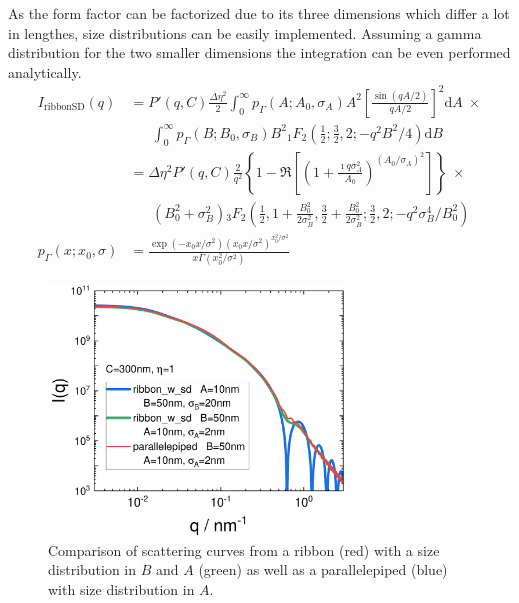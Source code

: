 As the form factor can be factorized due to its three dimensions which differ a lot in lengthes, size distributions can be easily implemented. Assuming a gamma distribution for the two smaller dimensions the integration can be even performed analytically.
\begin{align}\label{eq:ribbon_w_sd}
  I_\mathrm{ribbonSD}(q) &= P'(q,C) \frac{\Delta\eta^2}{2}
  \int_0^\infty p_\Gamma(A;A_0,\sigma_A) A^2 \left[\frac{\sin(qA/2)}{qA/2}\right]^2 \mathrm{d}A \; \times\nonumber \\
 &\phantom{=} \; \int_0^\infty p_\Gamma(B;B_0,\sigma_B) B^2 {}_1F_2\left(\frac12;\frac32,2;-q^2B^2/4\right) \mathrm{d}B \\
   &= \Delta\eta^2 P'(q,C) \frac{2}{q^2}\left\{1-\Re\left[\left(1+\frac{\imath q \sigma_A^2}{A_0}\right)^{(A_0/\sigma_A)^2}\right]\right\} \; \times \nonumber\\
   &\phantom{=} \; \left(B_0^2+\sigma_B^2\right) {}_3F_2\left(\frac12,1+\frac{B_0^2}{2\sigma_B^2},\frac32+\frac{B_0^2}{2\sigma_B^2};\frac32,2;-q^2\sigma_B^4/B_0^2\right) \\
  p_\Gamma(x;x_0,\sigma) &=
              \frac{\exp(-x_0 x/\sigma^2)
                    \left(x_0 x/\sigma^2\right)^{x_0^2/\sigma^2}
                   }{x\Gamma(x_0^2/\sigma^2)}
\end{align}
\begin{figure}[htb]
\begin{center}
\includegraphics[width=0.7\textwidth]{../images/form_factor/anisotropic/ribbon_wSDIQ.pdf}
\end{center}
\caption{Comparison of scattering curves from a ribbon (red) with a size distribution in $B$ and $A$ (green) as well as a parallelepiped (blue) with size distribution in $A$.}
\label{fig:ribbon_w_sd_IQ}
\end{figure}

